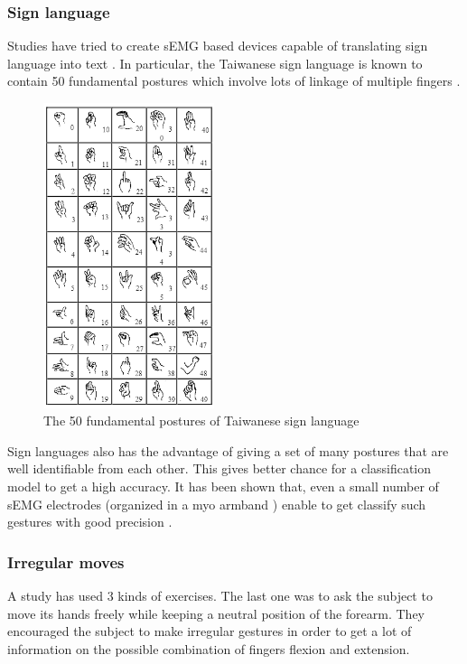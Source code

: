 \subsubsection{Sign language}

Studies have tried to create sEMG based devices capable of translating sign language into text \cite{ref:signLang, ref:signLang2}. In particular, the Taiwanese sign language is known to contain 50 fundamental postures which involve lots of linkage of multiple fingers \cite{ref:singleFingerGestPlusSignLang, ref:signLang}.

\begin{figure}[H]
    \centering
    \includegraphics[width=5cm]{images/taiwaneseSignLanguage.png}
    \caption{The 50 fundamental postures of Taiwanese sign language \cite{ref:signLang}}
    \label{fig:signLang}
\end{figure}

Sign languages also has the advantage of giving a set of many postures that are well identifiable from each other. This gives better chance for a classification model to get a high accuracy. It has been shown that, even a small number of sEMG electrodes (organized in a myo armband \cite{ref:myoArmBand}) enable to get classify such gestures with good precision \cite{ref:signLang2}.





\subsubsection{Irregular moves}

A study \cite{ref:Ngeo2014} has used 3 kinds of exercises. The last one was to ask the subject to move its hands freely while keeping a neutral position of the forearm. They encouraged the subject to make irregular gestures in order to get a lot of information on the possible combination of fingers flexion and extension.


